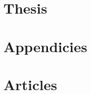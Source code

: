 \documentclass[%
	paper=A4,					%
	12pt,						%
	twoside=true,				%
	openany,                    %
	parskip=full,				%
	chapterprefix=true,			%
	headings=normal,			%
	bibliography=totoc,			%
	listof=totoc,				%
	titlepage=on,				%
	captions=tableabove,		%
	draft=false,				%
	abstract=on                 %
]{scrreprt}
\title{\thesisTitle}
\subtitle{\thesisSubtitle}
\author{\small{\thesisSubject} \\
        \thesisName \\
        \small{Supervised by {\thesisInternalSupervisor}}\\[-1.5ex]
        \small{Co-supervised by {\thesisInternalCoSupervisor}}\\
        \small{\thesisInstitute}\\[-1.5ex]
        \small{\thesisInstituteSecond}
    }
\date{\thesisDate}
\numberwithin{equation}{chapter} %
\begin{document}
\pagestyle{empty}				            %
\AddToShipoutPicture*{\TitleBackground}     %
\maketitle                                  %


\pagestyle{plain}

 


    \clearpage

\renewcommand{\cfttoctitlefont}{\thesischapterfont}
\renewcommand{\cftchapfont}{\normalsize\bfseries}
\renewcommand{\contentsname}{Table of Contents}
\setcounter{tocdepth}{2}		%
\tableofcontents				%
    \clearpage


\setcounter{page}{1}			%
\pagestyle{maincontentstyle} 	%


\begin{refsection}

\part{Thesis}










%



\renewcommand\thechapter{\Alph{chapter}}
\setcounter{chapter}{0}

\part{Appendicies}





\end{refsection}

\renewcommand\thechapter{\arabic{chapter}}
\setcounter{chapter}{0}

\part{Articles}



\end{document}

